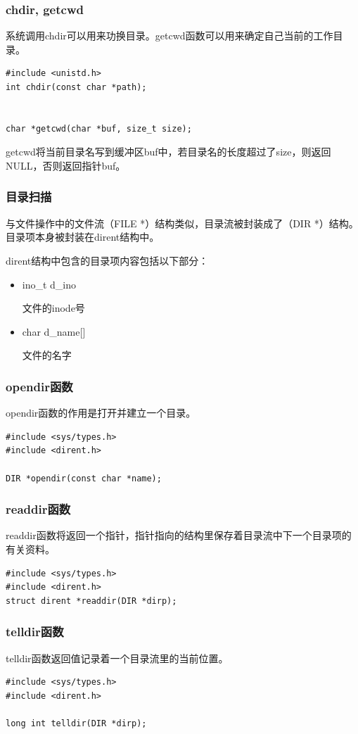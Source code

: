 \documentclass{beamer}
\begin{document}
\begin{frame}[fragile]
\frametitle{chdir, getcwd}
系统调用chdir可以用来功换目录。getcwd函数可以用来确定自己当前的工作目录。
\begin{example}
\begin{verbatim}
#include <unistd.h>
int chdir(const char *path);


char *getcwd(char *buf, size_t size);
\end{verbatim}
\end{example}
getcwd将当前目录名写到缓冲区buf中，若目录名的长度超过了size，则返回NULL，否则返回指针buf。
\end{frame}

\begin{frame}[fragile]
\frametitle{目录扫描}
与文件操作中的文件流（FILE *）结构类似，目录流被封装成了（DIR *）结构。目录项本身被封装在dirent结构中。

dirent结构中包含的目录项内容包括以下部分：
\begin{itemize}
\item
ino\_t d\_ino

文件的inode号
\item
char d\_name[]

文件的名字
\end{itemize}
\end{frame}
\begin{frame}[fragile]
\frametitle{opendir函数}
opendir函数的作用是打开并建立一个目录。
\begin{example}[opendir函数原型]
\begin{verbatim}
#include <sys/types.h>
#include <dirent.h>

DIR *opendir(const char *name);
\end{verbatim}
\end{example}
\end{frame}


\begin{frame}[fragile]
\frametitle{readdir函数}
readdir函数将返回一个指针，指针指向的结构里保存着目录流中下一个目录项的有关资料。
\begin{example}[readdir函数原型]
\begin{verbatim}
#include <sys/types.h>
#include <dirent.h>
struct dirent *readdir(DIR *dirp);
\end{verbatim}
\end{example}
\end{frame}

\begin{frame}[fragile]
\frametitle{telldir函数}
telldir函数返回值记录着一个目录流里的当前位置。
\begin{example}[telldir函数原型]
\begin{verbatim}
#include <sys/types.h>
#include <dirent.h>

long int telldir(DIR *dirp);
\end{verbatim}
\end{example}
\end{frame}
\end{document}
